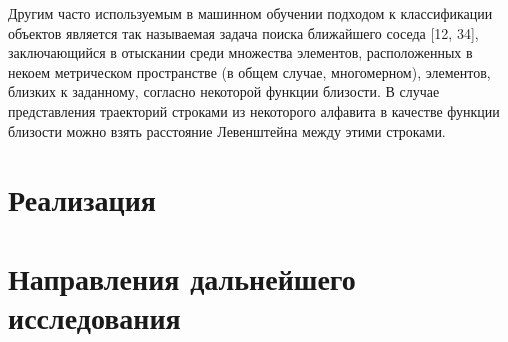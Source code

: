 \documentclass[a5paper]{article}
\begin{document}
Другим часто используемым в машинном обучении подходом к классификации объектов является так называемая задача поиска ближайшего соседа [12, 34], заключающийся
в отыскании среди множества элементов, расположенных в некоем метрическом пространстве (в общем случае, многомерном), элементов, близких к заданному, согласно 
некоторой функции близости. В случае представления траекторий строками из некоторого алфавита в качестве функции близости можно взять расстояние Левенштейна между
этими строками.




\section{Реализация}

\section{Направления дальнейшего исследования}
\end{document}
